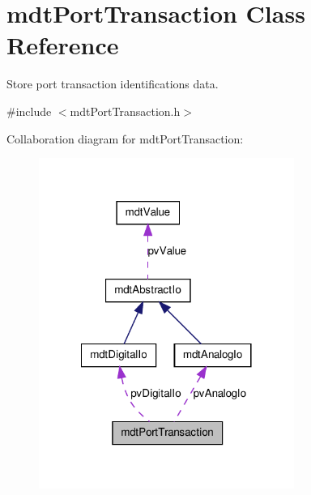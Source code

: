 \hypertarget{classmdt_port_transaction}{
\section{mdtPortTransaction Class Reference}
\label{classmdt_port_transaction}
}


Store port transaction identifications data.  




{\ttfamily \#include $<$mdtPortTransaction.h$>$}



Collaboration diagram for mdtPortTransaction:\nopagebreak
\begin{figure}[H]
\begin{center}
\leavevmode
\includegraphics[width=236pt]{classmdt_port_transaction__coll__graph}
\end{center}
\end{figure}
